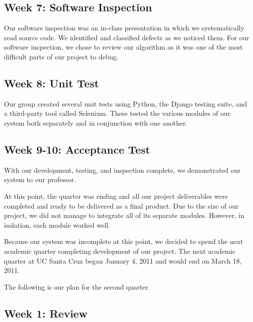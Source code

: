 \documentclass[12pt]{article}
\begin{document}
\subsection*{Week 7: Software Inspection}

Our software inspection was an in-class presentation in which we systematically read source code. We identified and classified defects as we noticed them. For our software inspection, we chose to review our algorithm as it was one of the most difficult parts of our project to debug.


\subsection*{Week 8: Unit Test}

Our group created several unit tests using Python, the Django testing suite, and a third-party tool called Selenium. These tested the various modules of our system both separately and in conjunction with one another. 

\subsection*{Week 9-10: Acceptance Test}

With our development, testing, and inspection complete, we demonstrated our system to our professor. 

At this point, the quarter was ending and all our project deliverables were completed and ready to be delivered as a final product. Due to the size of our project, we did not manage to integrate all of its separate modules. However, in isolation, each module worked well. 

Because our system was incomplete at this point, we decided to spend the next academic quarter completing development of our project. The next academic quarter at UC Santa Cruz began January 4, 2011 and would end on March 18, 2011. 

The following is our plan for the second quarter. 

\subsection*{Week 1: Review}
\end{document}
